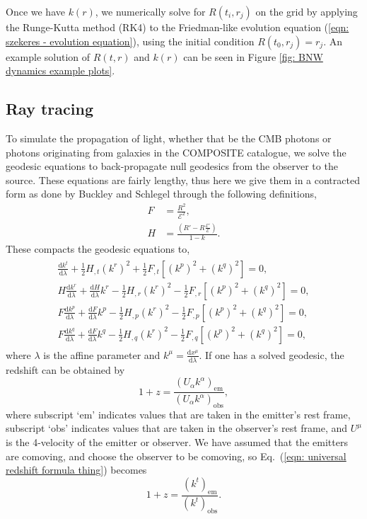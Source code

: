\documentclass[a4paper,12pt]{report}
\newcommand{\deriv}[2]{\frac{\text{d}{#1}}{\text{d}{#2}}}
\renewcommand{\eqref}[1]{Eq.~({#1})}
\begin{document}
Once we have $k(r)$, we numerically solve for $R(t_i, r_j)$ on the grid by applying the Runge-Kutta method (RK4) to the Friedman-like evolution equation (\ref{eqn: szekeres - evolution equation}), using the initial condition $R(t_0, r_j)=r_j$. An example solution of $R(t,r)$ and $k(r)$ can be seen in Figure \ref{fig: BNW dynamics example plots}.

\subsection{Ray tracing}
To simulate the propagation of light, whether that be the CMB photons or photons originating from galaxies in the COMPOSITE catalogue, we solve the geodesic equations to back-propagate null geodesics from the observer to the source. These equations are fairly lengthy, thus here we give them in a contracted form as done by Buckley and Schlegel \cite{RN1} through the following definitions,
\begin{align}
  F &= \frac{R^2}{\mathcal{E}^2}, \\
  H &= \frac{\left(R'-R\frac{\mathcal{E}'}{\mathcal{E}}\right)}{1-k}.
\end{align}
These compacts the geodesic equations to,
\begin{align}
  \begin{split}\label{eqn: Szekeres Geodesic Equations}
    \deriv{k^t}{\lambda} + \frac{1}{2}H_{,t}(k^r)^2 + \frac{1}{2}F_{,t}\left[(k^p)^2 + (k^q)^2\right] = 0, \\
    H\deriv{k^r}{\lambda} + \deriv{H}{\lambda}k^r - \frac{1}{2}H_{,r}(k^r)^2 - \frac{1}{2}F_{,r}\left[(k^p)^2 + (k^q)^2\right] = 0, \\
    F\deriv{k^p}{\lambda} + \deriv{F}{\lambda}k^p - \frac{1}{2}H_{,p}(k^r)^2 - \frac{1}{2}F_{,p}\left[(k^p)^2 + (k^q)^2\right] = 0, \\
    F\deriv{k^q}{\lambda} + \deriv{F}{\lambda}k^q - \frac{1}{2}H_{,q}(k^r)^2 - \frac{1}{2}F_{,q}\left[(k^p)^2 + (k^q)^2\right] = 0,
  \end{split}
\end{align}
where $\lambda$ is the affine parameter and $k^\mu = \deriv{x^\mu}{\lambda}$. If one has a solved geodesic, the redshift can be obtained by
\begin{equation}\label{eqn: universal redshift formula thing}
  1+z = \frac{(U_\alpha k^\alpha)_\text{em}}{(U_\alpha k^\alpha)_\text{obs}},
\end{equation}
where subscript `em' indicates values that are taken in the emitter's rest frame, subscript `obs' indicates values that are taken in the observer's rest frame, and $U^\mu$ is the 4-velocity of the emitter or observer. We have assumed that the emitters are comoving, and choose the observer to be comoving, so \eqref{\ref{eqn: universal redshift formula thing}} becomes
\begin{equation}\label{eqn: redshift formula comoving em and obs}
    1+z = \frac{(k^t)_\text{em}}{(k^t)_\text{obs}}.
\end{equation}
\end{document}
